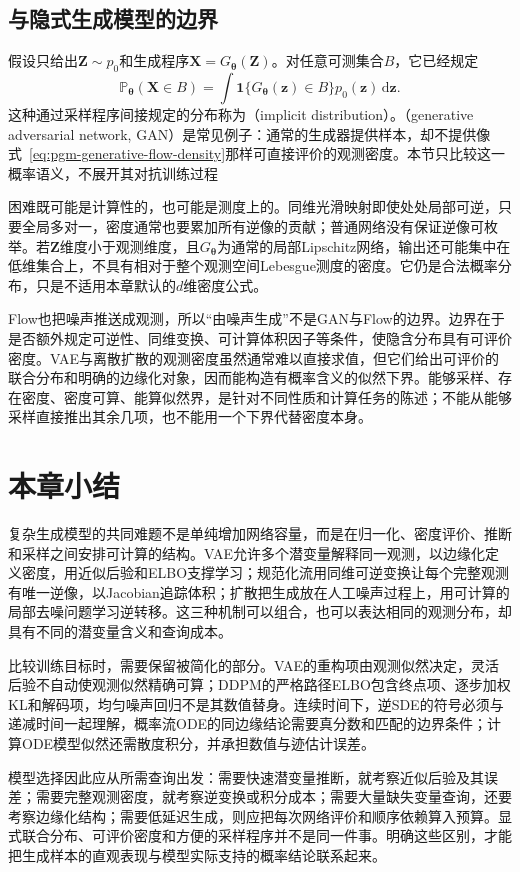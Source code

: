 \subsection{与隐式生成模型的边界}
\label{sec:pgm-generative-implicit-boundary}

假设只给出$\bm{Z}\sim p_0$和生成程序$\bm{X}=G_{\bm{\theta}}(\bm{Z})$。对任意可测集合$B$，它已经规定
\begin{equation}
  \label{eq:pgm-generative-pushforward}
  \mathbb{P}_{\bm{\theta}}(\bm{X}\in B)
  =\int \mathbf{1}\{G_{\bm{\theta}}(\bm{z})\in B\}
           p_0(\bm{z})\,\mathrm{d}\bm{z}.
\end{equation}
这种通过采样程序间接规定的分布称为（implicit distribution）。（generative adversarial network, GAN）是常见例子：通常的生成器提供样本，却不提供像式~\eqref{eq:pgm-generative-flow-density}那样可直接评价的观测密度。本节只比较这一概率语义，不展开其对抗训练过程

困难既可能是计算性的，也可能是测度上的。同维光滑映射即使处处局部可逆，只要全局多对一，密度通常也要累加所有逆像的贡献；普通网络没有保证逆像可枚举。若$\bm{Z}$维度小于观测维度，且$G_{\bm{\theta}}$为通常的局部Lipschitz网络，输出还可能集中在低维集合上，不具有相对于整个观测空间Lebesgue测度的密度。它仍是合法概率分布，只是不适用本章默认的$d$维密度公式。

Flow也把噪声推送成观测，所以“由噪声生成”不是GAN与Flow的边界。边界在于是否额外规定可逆性、同维变换、可计算体积因子等条件，使隐含分布具有可评价密度。VAE与离散扩散的观测密度虽然通常难以直接求值，但它们给出可评价的联合分布和明确的边缘化对象，因而能构造有概率含义的似然下界。能够采样、存在密度、密度可算、能算似然界，是针对不同性质和计算任务的陈述；不能从能够采样直接推出其余几项，也不能用一个下界代替密度本身。

\section{本章小结}
\label{sec:pgm-generative-summary}

复杂生成模型的共同难题不是单纯增加网络容量，而是在归一化、密度评价、推断和采样之间安排可计算的结构。VAE允许多个潜变量解释同一观测，以边缘化定义密度，用近似后验和ELBO支撑学习；规范化流用同维可逆变换让每个完整观测有唯一逆像，以Jacobian追踪体积；扩散把生成放在人工噪声过程上，用可计算的局部去噪问题学习逆转移。这三种机制可以组合，也可以表达相同的观测分布，却具有不同的潜变量含义和查询成本。

比较训练目标时，需要保留被简化的部分。VAE的重构项由观测似然决定，灵活后验不自动使观测似然精确可算；DDPM的严格路径ELBO包含终点项、逐步加权KL和解码项，均匀噪声回归不是其数值替身。连续时间下，逆SDE的符号必须与递减时间一起理解，概率流ODE的同边缘结论需要真分数和匹配的边界条件；计算ODE模型似然还需散度积分，并承担数值与迹估计误差。

模型选择因此应从所需查询出发：需要快速潜变量推断，就考察近似后验及其误差；需要完整观测密度，就考察逆变换或积分成本；需要大量缺失变量查询，还要考察边缘化结构；需要低延迟生成，则应把每次网络评价和顺序依赖算入预算。显式联合分布、可评价密度和方便的采样程序并不是同一件事。明确这些区别，才能把生成样本的直观表现与模型实际支持的概率结论联系起来。
